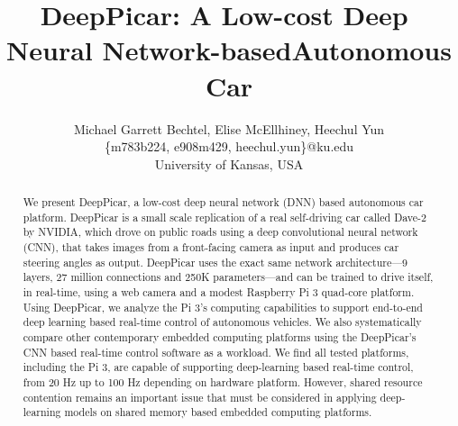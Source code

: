 \documentclass[10pt, conference]{IEEEtran}
\begin{document}
\title{DeepPicar:​ ​A​ ​Low-cost​ ​Deep​ ​Neural​ ​Network-based​ ​Autonomous​ ​Car}
\author{Michael Garrett Bechtel, Elise McEllhiney, Heechul Yun\\
\{m783b224, e908m429, heechul.yun\}@ku.edu\\
University of Kansas, USA\\ 
}

\maketitle
\thispagestyle{empty}
\begin{abstract}
We present DeepPicar, a low-cost deep neural network (DNN) based
autonomous car platform. DeepPicar is a small scale
replication of a real self-driving car called Dave-2 by NVIDIA, which
drove on public roads using a deep convolutional neural network (CNN), 
that takes images from a front-facing camera as input and produces
car steering angles as output. DeepPicar uses the exact same network
architecture---9 layers, 27 million connections and 250K
parameters---and can be trained to drive itself, in real-time, using a
web camera and a modest Raspberry Pi 3 quad-core platform.
Using DeepPicar, we analyze the Pi 3's computing capabilities to 
support end-to-end deep learning based real-time control of autonomous
vehicles. We also systematically compare other contemporary embedded
computing platforms using the DeepPicar's CNN based real-time control
software as a workload. 
We find all tested platforms, including the Pi 3, are capable of
supporting deep-learning based real-time control, from 20 Hz up to 100
Hz depending on hardware platform. 
However, shared resource contention remains an
important issue that must be considered in applying deep-learning
models on shared memory based embedded computing platforms.
\end{abstract}






% 




\appendix

\end{document}
